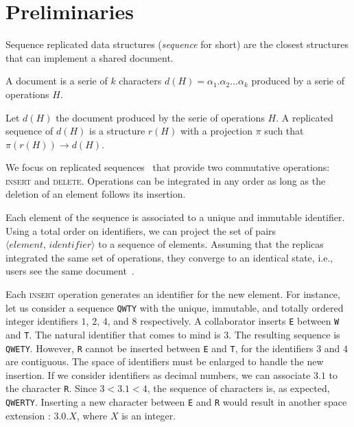 
\section{Preliminaries}
\label{sec:preliminaries}

Sequence replicated data structures (\emph{sequence} for short) are the closest
structures that can implement a shared document. 

\begin{definition}[Document]
  A document is a serie of $k$ characters
  $d(H) = \alpha_1.\alpha_2\ldots \alpha_k$ produced by a serie of operations
  $H$.
\end{definition}

\begin{definition}
  Let $d(H)$ the document produced by the serie of operations $H$. A replicated
  sequence of $d(H)$ is a structure $r(H)$ with a projection $\pi$ such that
  $\pi(r(H)) \rightarrow d(H)$.
\end{definition}

We focus on replicated sequences~\cite{shapiro2011comprehensive,
  shapiro2011conflict} that provide two commutative operations: \textsc{insert}
and \textsc{delete}. Operations can be integrated in any order as long as the
deletion of an element follows its insertion.

\noindent Each element of the sequence is associated to a unique and immutable
identifier. Using a total order on identifiers, we can project the set of pairs
$\langle element,\, identifier \rangle$ to a sequence of elements. Assuming that
the replicas integrated the same set of operations, they converge to an
identical state, i.e., users see the same document~\cite{shapiro2011conflict}.

Each \textsc{insert} operation generates an identifier for the new element.  For
instance, let us consider a sequence \texttt{QWTY} with the unique, immutable,
and totally ordered integer identifiers $1$, $2$, $4$, and $8$ respectively. A
collaborator inserts \texttt{E} between \texttt{W} and \texttt{T}. The natural
identifier that comes to mind is $3$. The resulting sequence is
\texttt{QWETY}. However, \texttt{R} cannot be inserted between \texttt{E} and
\texttt{T}, for the identifiers $3$ and $4$ are contiguous. The space of
identifiers must be enlarged to handle the new insertion. If we consider
identifiers as decimal numbers, we can associate $3.1$ to the character
\texttt{R}. Since $3 < 3.1 < 4$, the sequence of characters is, as expected,
\texttt{QWERTY}. Inserting a new character between \texttt{E} and \texttt{R}
would result in another space extension : $3.0.X$, where $X$ is an integer.

